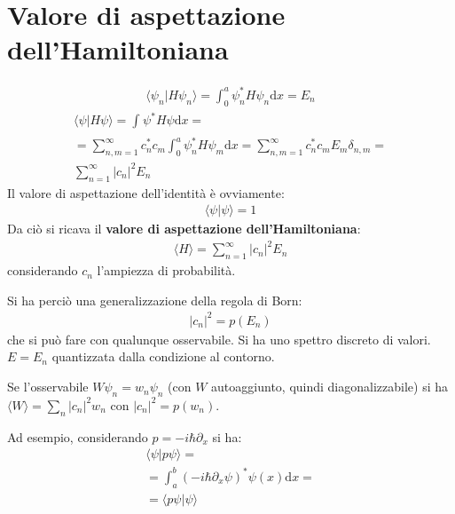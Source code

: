 \section{Valore di aspettazione dell'Hamiltoniana} %
\begin{equation}\begin{split}
\langle\psi _n | H \psi _n\rangle =\int_{0}^{a}{\psi_n ^*H\psi_n  \textrm{d}x}=E_n
\end{split}\end{equation}
\begin{equation}\begin{split}
\langle \psi | H\psi \rangle =\int_{}^{}{\psi ^*H\psi  \textrm{d}x}=\\
=\sum_{n,m=1}^{\infty }c_n^*c_m\int_{0}^{a}{\psi ^*_nH\psi _m \textrm{d}x}=\sum_{n,m=1}^{\infty }c_n^*c_mE_m\delta _{n,m}=\\
\sum_{n=1}^{\infty }|c_n|^2E_n
\end{split}\end{equation}
Il valore di aspettazione dell'identità è ovviamente:
\begin{equation}\begin{split}
\langle \psi | \psi \rangle=1
\end{split}\end{equation}
Da ciò si ricava il \textbf{valore di aspettazione dell'Hamiltoniana}:
\begin{equation}\begin{split}
\langle H \rangle = \sum_{n=1}^{\infty }|c_n|^2E_n
\end{split}\end{equation}
considerando $c_n$ l'ampiezza di probabilità.

Si ha perciò una generalizzazione della regola di Born:
\begin{equation}\begin{split}
|c_n|^2=p\left(E_n\right)
\end{split}\end{equation}
che si può fare con qualunque osservabile. Si ha uno spettro discreto di valori. $E=E_n$ quantizzata dalla condizione al contorno.

Se l'osservabile $W\psi _n=w_n\psi _n$ (con $W$ autoaggiunto, quindi diagonalizzabile) si ha $\langle W \rangle= \sum_{n}^{}|c_n|^2w_n$ con $|c_n|^2=p\left(w_n\right)$.

Ad esempio, considerando $p=-i\hbar \partial _x$ si ha:
\begin{equation}\begin{split}
\langle \psi | p\psi \rangle = \\
=\int_{a}^{b}{\left(-i\hbar \partial _x\psi \right)^*\psi \left(x\right) \textrm{d}x}=\\
=\langle p\psi |\psi \rangle
\end{split}\end{equation}

